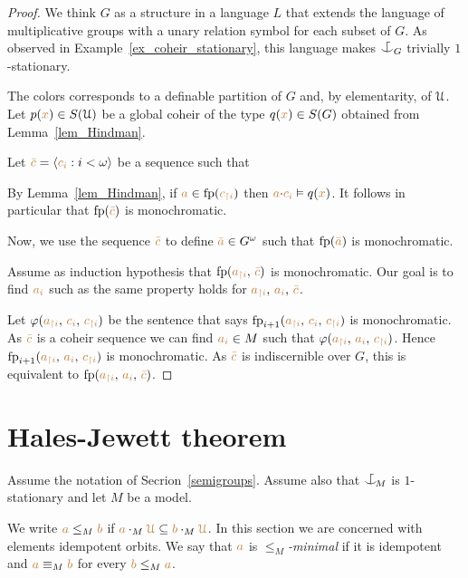 \documentclass[creche.tex]{subfiles}
\begin{document}
\begin{proof}
We think $G$ as a structure in a language $L$ that extends the language of multiplicative groups with a unary relation symbol for each subset of $G$.
As observed in Example~\ref{ex_coheir_stationary}, this language makes $\nonforkc_G$ trivially $1$-stationary.

The colors corresponds to a definable partition of $G$ and, by elementarity, of $\EuScript U$.
Let $p({\color{brown} x})\in S(\EuScript U)$ be a global coheir of the type $q({\color{brown} x})\in S(G)$ obtained from Lemma~\ref{lem_Hindman}.

Let ${\color{brown}\bar c}=\langle{\color{brown}c_i}:i<\omega\rangle$ be a sequence such that


By Lemma~\ref{lem_Hindman}, if ${\color{brown} a}\in {\rm fp}({\color{brown} c_{\restriction i}})$ then ${\color{brown} a}{\cdot}{\color{brown} c_i}\vDash q({\color{brown} x})$.
It follows in particular that ${\rm fp}({\color{brown}\bar c})$ is monochromatic.


Now, we use the sequence ${\color{brown}\bar c}$ to define ${\color{brown}\bar a}\in G^\omega$ such that ${\rm fp}({\color{brown}\bar a})$ is monochromatic.

Assume as induction hypothesis that ${\rm fp}({\color{brown} a_{\restriction i}},\,{\color{brown}\bar c})$ is monochromatic.
Our goal is to find ${\color{brown} a_i}$ such as the same property holds for ${\color{brown} a_{\restriction i}},\,{\color{brown} a_i},\,{\color{brown}\bar c}$.


Let $\varphi({\color{brown} a_{\restriction i}},\,{\color{brown} c_i},\,{\color{brown} c_{\restriction i}})$ be the sentence that says ${\rm fp}_{i+1}({\color{brown} a_{\restriction i}},\,{\color{brown} c_i},\,{\color{brown} c_{\restriction i}})$ is monochromatic.
As ${\color{brown}\bar c}$ is a coheir sequence we can find  ${\color{brown} a_i}\in M$ such that $\varphi({\color{brown} a_{\restriction i}},\,{\color{brown} a_i},\,{\color{brown} c_{\restriction i}})$.
  Hence ${\rm fp}_{i+1}({\color{brown} a_{\restriction i}},\,{\color{brown} a_i},\,{\color{brown} c_{\restriction i}})$ is monochromatic.
 As ${\color{brown}\bar c}$ is indiscernible over $G$, this is equivalent to  ${\rm fp}({\color{brown} a_{\restriction i}},\,{\color{brown} a_i},\,{\color{brown}\bar c})$.
\end{proof}



\section{Hales-Jewett theorem}
\def\mrI{{\mr\I}} 
Assume the notation of Secrion~\ref{semigroups}.
Assume also that $\nonforkc_{\!M}$ is $1$-stationary and let $M$ be a model.

We write ${\color{brown} a}\le_M{\color{brown} b}$ if ${\color{brown} a}\cdot_M{\color{brown}\EuScript U}\subseteq{\color{brown}b}\cdot_M{\color{brown}\EuScript U}$.
In this section we are concerned with elements idempotent orbits.
We say that ${\color{brown} a}$ is \emph{$\le_M$-minimal\/} if 
it is idempotent and ${\color{brown} a}\equiv_M{\color{brown} b}$ for every ${\color{brown} b}\le_M{\color{brown} a}$.
\end{document}
